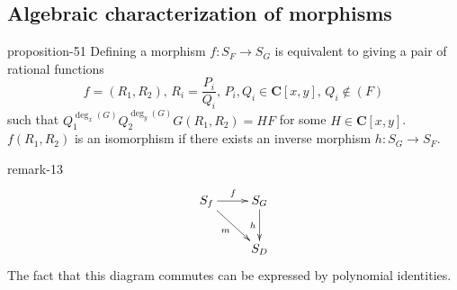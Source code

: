 \documentclass[10pt,]{book}
\numberwithin{equation}{section}
\newcommand{\lb}{[}
\newcommand{\rb}{]}
\newcommand{\CC}{\mathbf{C}}
\begin{document}
\subsection[{Algebraic characterization of morphisms}]{Algebraic characterization of morphisms}\label{subsection-54}
\begin{proposition}{}{}{proposition-51}%
\hypertarget{p-609}{}%
Defining a morphism \(f \colon S_F\to S_G\) is equivalent to giving a pair of rational functions%
\begin{equation*}
f=  (R_1, R_2),\,R_i= \frac{P_i}{Q_i},\,    P_i,Q_i\in \CC[x,y],\,Q_i\not\in (F)
\end{equation*}
such that \(Q_1^{\deg_x(G)}Q_2^{\deg_y(G)} G(R_1, R_2) = HF\) for some \(H \in \CC\lb x, y\rb\). \(f(R_1, R_2)\) is an isomorphism if there exists an inverse morphism \(h\colon S_G\to S_F\).%
\end{proposition}
\begin{remark}{}{remark-13}%
\hypertarget{p-610}{}%
%
\begin{equation*}
\xymatrix{
S_f \ar[r]^f \ar[dr]_m & S_G \ar[d]_h \\
& S_D
}
\end{equation*}
The fact that this diagram commutes can be expressed by polynomial identities.%
\end{remark}
%
%
\typeout{************************************************}
\typeout{************************************************}
%
\end{document}
